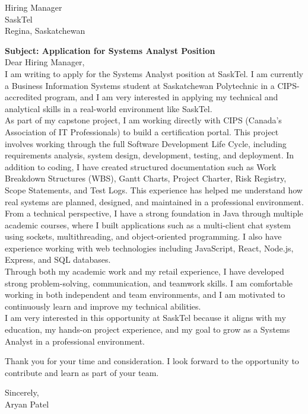 \documentclass[letterpaper,11pt]{article}
\begin{document}
\vspace{2mm}

\begin{flushleft}
Hiring Manager \\
SaskTel \\
Regina, Saskatchewan \\
\end{flushleft}

\vspace{5mm}

\noindent \textbf {Subject: Application for Systems Analyst Position}\\ 

\noindent Dear Hiring Manager,\\

\noindent I am writing to apply for the Systems Analyst position at SaskTel. I am currently a Business Information Systems student at Saskatchewan Polytechnic in a CIPS-accredited program, and I am very interested in applying my technical and analytical skills in a real-world environment like SaskTel.\\

\noindent As part of my capstone project, I am working directly with CIPS (Canada’s Association of IT Professionals) to build a certification portal. This project involves working through the full Software Development Life Cycle, including requirements analysis, system design, development, testing, and deployment. In addition to coding, I have created structured documentation such as Work Breakdown Structures (WBS), Gantt Charts, Project Charter, Risk Registry, Scope Statements, and Test Logs. This experience has helped me understand how real systems are planned, designed, and maintained in a professional environment.\\

\noindent From a technical perspective, I have a strong foundation in Java through multiple academic courses, where I built applications such as a multi-client chat system using sockets, multithreading, and object-oriented programming. I also have experience working with web technologies including JavaScript, React, Node.js, Express, and SQL databases.\\

\noindent Through both my academic work and my retail experience, I have developed strong problem-solving, communication, and teamwork skills. I am comfortable working in both independent and team environments, and I am motivated to continuously learn and improve my technical abilities.\\

\noindent I am very interested in this opportunity at SaskTel because it aligns with my education, my hands-on project experience, and my goal to grow as a Systems Analyst in a professional environment.

\noindent Thank you for your time and consideration. I look forward to the opportunity to contribute and learn as part of your team.

\vspace{5mm}

\noindent Sincerely, \\
Aryan Patel
\end{document}

